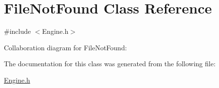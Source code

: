 \hypertarget{class_file_not_found}{}\section{File\+Not\+Found Class Reference}
\label{class_file_not_found}


{\ttfamily \#include $<$Engine.\+h$>$}



Collaboration diagram for File\+Not\+Found\+:


The documentation for this class was generated from the following file\+:\begin{DoxyCompactItemize}
\item 
\hyperlink{_engine_8h}{Engine.\+h}\end{DoxyCompactItemize}
